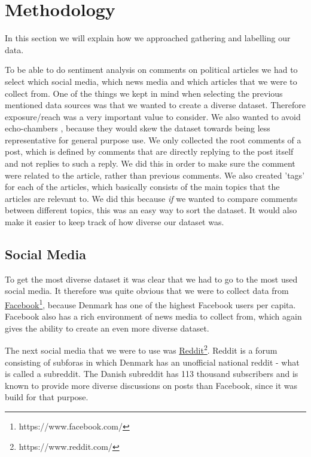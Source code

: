 \section{Methodology}

In this section we will explain how we approached gathering and labelling our data.

To be able to do sentiment analysis on comments on political articles we had to select which social media, which news media and which articles that we were to collect from. One of the things we kept in mind when selecting the previous mentioned data sources was that we wanted to create a diverse dataset. Therefore exposure/reach was a very important value to consider. We also wanted to avoid echo-chambers \cite{echochamber}, because they would skew the dataset towards being less representative for general purpose use.
We only collected the root comments of a post, which is defined by comments that are directly replying to the post itself and not replies to such a reply.
We did this in order to make sure the comment were related to the article, rather than previous comments.
We also created 'tags' for each of the articles, which basically consists of the main topics that the articles are relevant to. We did this because \textit{if} we wanted to compare comments between different topics, this was an easy way to sort the dataset. It would also make it easier to keep track of how diverse our dataset was.

\subsection{Social Media}

To get the most diverse dataset it was clear that we had to go to the most used social media. It therefore was quite obvious that we were to collect data from \href{https://www.facebook.com/}{Facebook}\footnote{https://www.facebook.com/}, because Denmark has one of the highest Facebook users per capita.
Facebook also has a rich environment of news media to collect from, which again gives the ability to create an even more diverse dataset.

The next social media that we were to use was \href{https://www.reddit.com/}{Reddit}\footnote{https://www.reddit.com/}. Reddit is a forum consisting of subforas in which Denmark has an unofficial national reddit - what is called a subreddit. The Danish subreddit has 113 thousand subscribers and is known to provide more diverse discussions on posts than Facebook, since it was build for that purpose\cite{redditinc}.

